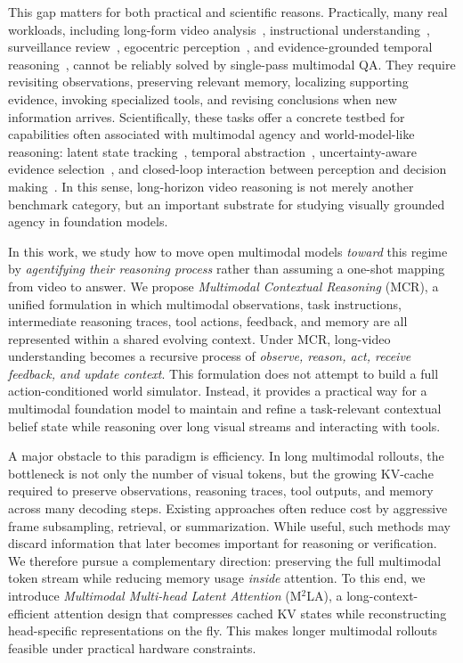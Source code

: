 \documentclass[11pt, letterpaper]{template}
\theoremstyle{plain}
\theoremstyle{definition}
\theoremstyle{remark}
\begin{document}
This gap matters for both practical and scientific reasons. Practically, many real workloads, including long-form video analysis~\citep{longvideobench,wang2024lvbench}, instructional understanding~\citep{howto100m}, surveillance review~\citep{sultani2018real}, egocentric perception~\citep{ego4d,egoschema}, and evidence-grounded temporal reasoning~\citep{lei2018tvqa,nextgqa,liu2024tempcompass}, cannot be reliably solved by single-pass multimodal QA. They require revisiting observations, preserving relevant memory, localizing supporting evidence, invoking specialized tools, and revising conclusions when new information arrives. Scientifically, these tasks offer a concrete testbed for capabilities often associated with multimodal agency and world-model-like reasoning: latent state tracking~\citep{hansen2022temporal,hansen2024td}, temporal abstraction~\citep{machado2023temporal, kong2024latent}, uncertainty-aware evidence selection~\citep{asai2024self}, and closed-loop interaction between perception and decision making~\citep{ahn2022can,brohan2022rt}. In this sense, long-horizon video reasoning is not merely another benchmark category, but an important substrate for studying visually grounded agency in foundation models.

In this work, we study how to move open multimodal models \emph{toward} this regime by \emph{agentifying their reasoning process} rather than assuming a one-shot mapping from video to answer. We propose \emph{Multimodal Contextual Reasoning} (MCR), a unified formulation in which multimodal observations, task instructions, intermediate reasoning traces, tool actions, feedback, and memory are all represented within a shared evolving context. Under MCR, long-video understanding becomes a recursive process of \emph{observe, reason, act, receive feedback, and update context}. This formulation does not attempt to build a full action-conditioned world simulator. Instead, it provides a practical way for a multimodal foundation model to maintain and refine a task-relevant contextual belief state while reasoning over long visual streams and interacting with tools.

A major obstacle to this paradigm is efficiency. In long multimodal rollouts, the bottleneck is not only the number of visual tokens, but the growing KV-cache required to preserve observations, reasoning traces, tool outputs, and memory across many decoding steps. Existing approaches often reduce cost by aggressive frame subsampling, retrieval, or summarization. While useful, such methods may discard information that later becomes important for reasoning or verification. We therefore pursue a complementary direction: preserving the full multimodal token stream while reducing memory usage \emph{inside} attention. To this end, we introduce \emph{Multimodal Multi-head Latent Attention} (M$^2$LA), a long-context-efficient attention design that compresses cached KV states while reconstructing head-specific representations on the fly. This makes longer multimodal rollouts feasible under practical hardware constraints.
\end{document}
